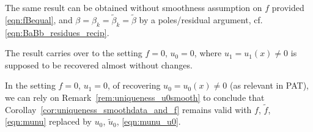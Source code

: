 \begin{remark}
The same result can be obtained without smoothness assumption on $f$ 
provided \eqref{eqn:fBequal}, and $\beta=\beta_k=\tilde{\beta}_k=\tilde{\beta}$ by a poles/residual argument, cf. \eqref{eqn:BaBb_residues_recip}.
\end{remark}

\begin{remark}\label{rem:uniqueness_smoothdata_and_u1_u0}
The result carries over to the setting $f=0$, $u_0=0$, where $u_1=u_1(x)\not=0$ is supposed to be recovered almost without changes.

In the setting $f=0$, $u_1=0$, of recovering $u_0=u_0(x)\not=0$ (as relevant in PAT), we can rely on Remark~\ref{rem:uniqueness_u0smooth} to conclude that Corollay~\ref{cor:uniqueness_smoothdata_and_f} remains valid with $f$, $\tilde{f}$, \eqref{eqn:munu} replaced by $u_0$, $\tilde{u}_0$, \eqref{eqn:munu_u0}.
\end{remark}

